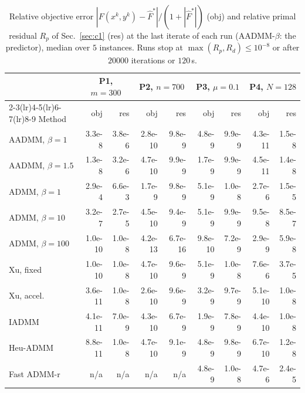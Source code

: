 \begin{table}[htbp]
\centering
\caption{Relative objective error $|F(x^k,y^k)-\widehat F^{*}|/(1+|\widehat F^{*}|)$ (obj) and relative primal residual $R_p$ of Sec.~\ref{sec:c1} (res) at the last iterate of each run (AADMM-$\beta$: the predictor), median over $5$ instances. Runs stop at $\max(R_p,R_d)\le10^{-8}$ or after $20000$ iterations or $120$\,s.}\label{tab:c1-objerr}
\scriptsize\setlength{\tabcolsep}{2.4pt}
\begin{tabular}{lrrrrrrrr}
\toprule
 & \multicolumn{2}{c}{P1, $m{=}300$} & \multicolumn{2}{c}{P2, $n{=}700$} & \multicolumn{2}{c}{P3, $\mu{=}0.1$} & \multicolumn{2}{c}{P4, $N{=}128$} \\
\cmidrule(lr){2-3}\cmidrule(lr){4-5}\cmidrule(lr){6-7}\cmidrule(lr){8-9}
Method & obj & res & obj & res & obj & res & obj & res \\
\midrule
AADMM, $\beta{=}1$ & 3.3e-8 & 3.8e-6 & 2.8e-10 & 9.8e-9 & 4.8e-9 & 9.9e-9 & 4.3e-11 & 1.5e-8 \\
AADMM, $\beta{=}1.5$ & 1.3e-8 & 3.2e-6 & 4.7e-10 & 9.9e-9 & 1.7e-9 & 9.9e-9 & 4.5e-11 & 1.4e-8 \\
\addlinespace[2pt]
ADMM, $\beta{=}1$ & 2.9e-4 & 6.6e-3 & 1.7e-9 & 9.8e-9 & 5.1e-9 & 1.0e-8 & 2.7e-6 & 1.5e-5 \\
ADMM, $\beta{=}10$ & 3.2e-7 & 2.7e-5 & 4.5e-10 & 9.4e-9 & 5.1e-9 & 9.9e-9 & 9.5e-8 & 8.5e-7 \\
ADMM, $\beta{=}100$ & 1.0e-10 & 1.0e-8 & 4.2e-13 & 6.7e-16 & 9.8e-10 & 7.2e-9 & 2.9e-9 & 5.9e-8 \\
\addlinespace[2pt]
Xu, fixed & 1.0e-10 & 1.0e-8 & 4.7e-10 & 9.6e-9 & 5.1e-9 & 1.0e-8 & 7.6e-6 & 3.7e-5 \\
Xu, accel. & 3.6e-11 & 1.0e-8 & 2.6e-10 & 9.6e-9 & 3.2e-9 & 9.7e-9 & 5.1e-10 & 1.0e-8 \\
IADMM & 4.1e-11 & 7.0e-9 & 4.3e-10 & 6.7e-9 & 1.9e-9 & 7.8e-9 & 4.4e-10 & 1.0e-8 \\
Heu-ADMM & 8.8e-11 & 1.0e-8 & 4.7e-10 & 9.1e-9 & 4.8e-9 & 9.8e-9 & 6.7e-10 & 1.2e-8 \\
Fast ADMM-r & n/a & n/a & n/a & n/a & 4.8e-9 & 1.0e-8 & 4.7e-6 & 2.4e-5 \\
\bottomrule
\end{tabular}
\end{table}

